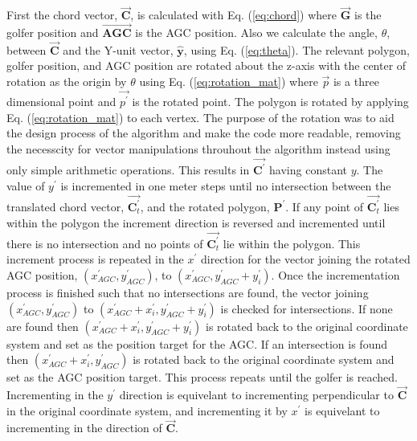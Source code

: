 \documentclass[11pt,landscape]{article}
\begin{document}
\begin{multicols}{3}
First the chord vector, $\overrightarrow{\mathbf{C}}$, is calculated with Eq. (\ref{eq:chord})
where $\overrightarrow{\mathbf{G}}$ is the golfer position and $\overrightarrow{\mathbf{AGC}}$ is
the AGC position. Also we calculate the angle, $\theta$, between
$\overrightarrow{\mathbf{C}}$ and the Y-unit vector, $\hat{\mathbf{y}}$, using
Eq. (\ref{eq:theta}).  The relevant polygon, golfer position, and AGC position are rotated
about the z-axis with the center of rotation as the origin by $\theta$ using Eq.
(\ref{eq:rotation_mat}) where $\overrightarrow{p}$ is a three dimensional point and
$\overrightarrow{p^\prime}$ is the rotated point. The polygon is rotated by
applying Eq. (\ref{eq:rotation_mat}) to each vertex. The purpose of the rotation was to aid the
design process of the algorithm and make the code more readable, removing the
necesscity for vector manipulations throuhout the algorithm instead using only
simple arithmetic operations. This results in
$\overrightarrow{\mathbf{C}^\prime}$ having constant $y$. The value of
$y^\prime$ is incremented in one meter steps until no intersection between the
translated chord vector, $\overrightarrow{\mathbf{C}^\prime_t}$, and the rotated
polygon, $\mathbf{P}^\prime$. If any point of
$\overrightarrow{\mathbf{C}^\prime_t}$ lies within the polygon the increment
direction is reversed and incremented until there is no intersection and no
points of $\overrightarrow{\mathbf{C}^\prime_t}$ lie within the polygon. This
increment process is repeated in the $x^\prime$ direction for the vector joining
the rotated AGC position, $\left(x^\prime_{AGC}, y^\prime_{AGC}\right)$, to
$\left(x^\prime_{AGC}, y^\prime_{AGC} + y^\prime_i\right)$. Once the
incrementation process is finished such that no intersections are found, the
vector joining $\left(x^\prime_{AGC}, y^\prime_{AGC}\right)$ to
$\left(x^\prime_{AGC}+x^\prime_i, y^\prime_{AGC} + y^\prime_i\right)$ is checked
for intersections. If none are found then $\left(x^\prime_{AGC}+x^\prime_i,
y^\prime_{AGC} + y^\prime_i\right)$ is rotated back to the original coordinate
system and set as the position target for the AGC. If an intersection is found
then $\left(x^\prime_{AGC}+x^\prime_i, y^\prime_{AGC}\right)$ is rotated back to
the original coordinate system and set as the AGC position target. This process
repeats until the golfer is reached. Incrementing in the $y^\prime$ direction is
equivelant to incrementing perpendicular to $\overrightarrow{\mathbf{C}}$ in the
original coordinate system, and incrementing it by $x^\prime$ is equivelant to
incrementing in the direction of $\overrightarrow{\mathbf{C}}$.


\end{multicols}
\end{document}
